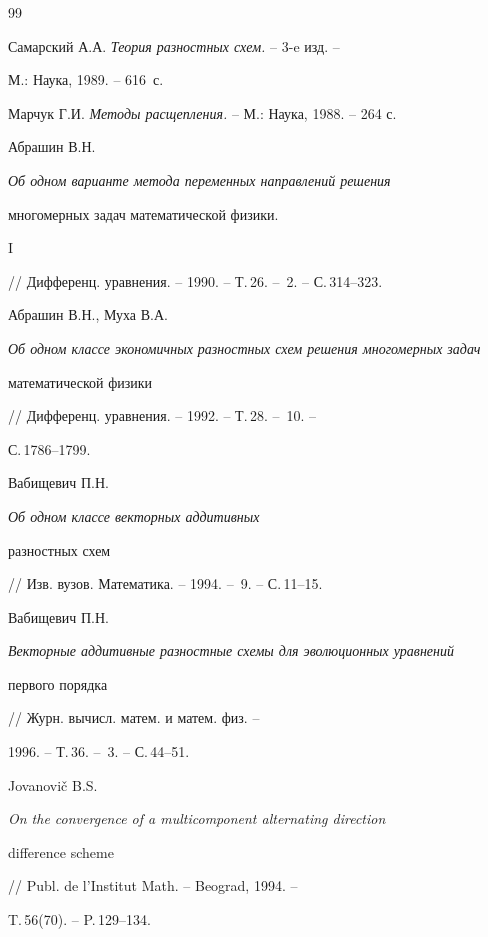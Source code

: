 \begin{thebibliography}{99}







Самарский А.А. {\it Теория разностных схем.} -- 3-e изд. --


М.: Наука, 1989. -- 616~с.




Марчук Г.И. {\it Методы расщепления.} -- М.: Наука, 1988. -- 264 с.




Абрашин В.Н.


{\it Об одном варианте метода переменных направлений решения 


многомерных задач математической физики.} I


// Дифференц. уравнения. -- 1990. -- Т.\,26. -- \No\,2. -- С.\,314--323.




Абрашин В.Н., Муха В.А.


{\it Об одном классе экономичных разностных схем решения многомерных задач 


математической физики}


// Дифференц. уравнения. -- 1992. -- Т.\,28. -- \No\,10. --


С.\,1786--1799.




Вабищевич П.Н. {\it Об одном классе векторных аддитивных


разностных схем} // Изв. вузов. Математика. -- 1994. -- \No\,9. -- С.\,11--15.




Вабищевич П.Н.


{\it Векторные аддитивные разностные схемы для эволюционных уравнений


первого порядка}


// Журн. вычисл. матем. и матем. физ. --


 1996. -- Т.\,36. -- \No\,3. -- С.\,44--51.




Jovanovi\v{c} B.S.


{\it On the convergence of a multicomponent alternating directi\-on


difference scheme}


// Publ. de l'Institut Math. -- Beograd, 1994. --


T.\,56(70). -- P.\,129--134.



\end{thebibliography}
